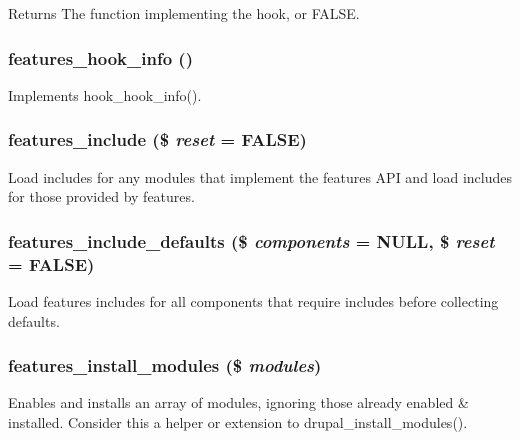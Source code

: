 \begin{DoxyReturn}{Returns}
The function implementing the hook, or FALSE. 
\end{DoxyReturn}
\hypertarget{features_8module_a7d3ed140b4b5553cbf7fc46f0bb42af2}{
\subsubsection[{features\_\-hook\_\-info}]{\setlength{\rightskip}{0pt plus 5cm}features\_\-hook\_\-info ()}}
\label{features_8module_a7d3ed140b4b5553cbf7fc46f0bb42af2}
Implements hook\_\-hook\_\-info(). \hypertarget{features_8module_aa808105e0eafb3744d0cdcfe50802456}{
\subsubsection[{features\_\-include}]{\setlength{\rightskip}{0pt plus 5cm}features\_\-include (\$ {\em reset} = {\ttfamily FALSE})}}
\label{features_8module_aa808105e0eafb3744d0cdcfe50802456}
Load includes for any modules that implement the features API and load includes for those provided by features. \hypertarget{features_8module_a359c52c08e57a3bdd13594abd116543e}{
\subsubsection[{features\_\-include\_\-defaults}]{\setlength{\rightskip}{0pt plus 5cm}features\_\-include\_\-defaults (\$ {\em components} = {\ttfamily NULL}, \/  \$ {\em reset} = {\ttfamily FALSE})}}
\label{features_8module_a359c52c08e57a3bdd13594abd116543e}
Load features includes for all components that require includes before collecting defaults. \hypertarget{features_8module_a379679b547f18695cf0e547fe936b002}{
\subsubsection[{features\_\-install\_\-modules}]{\setlength{\rightskip}{0pt plus 5cm}features\_\-install\_\-modules (\$ {\em modules})}}
\label{features_8module_a379679b547f18695cf0e547fe936b002}
Enables and installs an array of modules, ignoring those already enabled \& installed. Consider this a helper or extension to drupal\_\-install\_\-modules().


